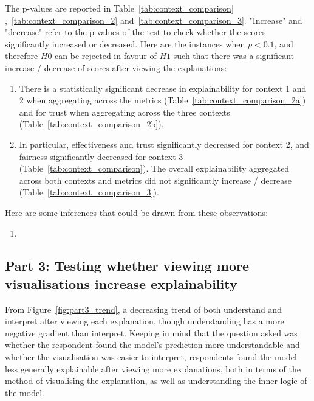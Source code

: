 The p-values are reported in Table~\ref{tab:context_comparison} ,~\ref{tab:context_comparison_2} and~\ref{tab:context_comparison_3}. "Increase" and "decrease" refer to the p-values of the test to check whether the scores significantly increased or decreased. Here are the instances when $p<0.1$, and therefore $H0$ can be rejected in favour of $H1$ such that there was a significant increase / decrease of scores after viewing the explanations:
\begin{enumerate}
    \item There is a statistically significant decrease in explainability for context 1 and 2 when aggregating across the metrics (Table~\ref{tab:context_comparison_2a}) and for trust when aggregating across the three contexts (Table~\ref{tab:context_comparison_2b}).
    \item In particular, effectiveness and trust significantly decreased for context 2, and fairness significantly decreased for context 3 (Table~\ref{tab:context_comparison}). 
    The overall explainability aggregated across both contexts and metrics did not significantly increase / decrease (Table~\ref{tab:context_comparison_3}).
\end{enumerate}

Here are some inferences that could be drawn from these observations:
\begin{enumerate}
    \item 
\end{enumerate}

\subsection{Part 3: Testing whether viewing more visualisations increase explainability}
From Figure~\ref{fig:part3_trend}, a decreasing trend of both understand and interpret after viewing each explanation, though understanding has a more negative gradient than interpret. Keeping in mind that the question asked was whether the respondent found the model's prediction more understandable and whether the visualisation was easier to interpret, respondents found the model less generally explainable after viewing more explanations, both in terms of the method of visualising the explanation, as well as understanding the inner logic of the model. 

